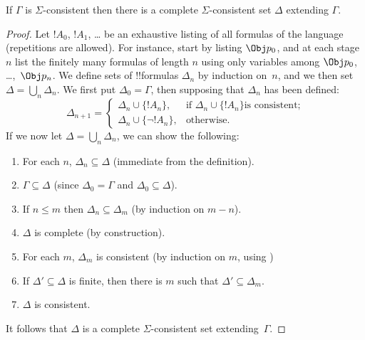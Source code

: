 \documentclass[../../../include/open-logic-section]{subfiles}
\begin{document}


\begin{thm}
  If $\Gamma$ is $\Sigma$-consistent then there is a complete
  $\Sigma$-consistent set $\Delta$ extending $\Gamma$.
\end{thm}

\begin{proof}
Let $!A_0$, $!A_1$, \dots{} be an exhaustive listing of all formulas
of the language (repetitions are allowed). For instance, start by
listing $\Obj p_0$, and at each stage $n$ list the finitely many
formulas of length $n$ using only variables among $\Obj p_0$,
\dots,~$\Obj p_n$. We define sets of !!{formula}s $\Delta_n$ by
induction on~$n$, and we then set $\Delta = \bigcup_n \Delta_n$. We
first put $\Delta_0 = \Gamma$, then supposing that $\Delta_n$ has been
defined:
\[
\Delta_{n+1} =
\begin{cases}
  \Delta_n \cup \{!A_n\}, & \text{if $\Delta_n \cup \{ !A_n\}$
    is consistent;} \\
  \Delta_n \cup \{ \lnot !A_n\}, & \text{otherwise.}
\end{cases}
\]
If we now let $\Delta = \bigcup_n \Delta_n$, we can show the
following:
\begin{enumerate}
\item For each $n$, $\Delta_n \subseteq \Delta$ (immediate from the
  definition).
\item $\Gamma \subseteq \Delta$ (since $\Delta_ 0 = \Gamma$ and
  $\Delta_0 \subseteq \Delta$).
\item If $n \le m$ then $\Delta_n \subseteq \Delta_m$ (by induction on
  $m-n$).
\item $\Delta$ is complete (by construction).
\item For each $m$, $\Delta_m$ is consistent (by induction on $m$,
  using
  )
\item If $\Delta' \subseteq \Delta$ is finite, then there is $m$ such
  that $\Delta' \subseteq \Delta_m$.
\item $\Delta$ is consistent. 
\end{enumerate}
It follows that $\Delta$ is a complete $\Sigma$-consistent set
extending~$\Gamma$.
\end{proof}
\end{document}

